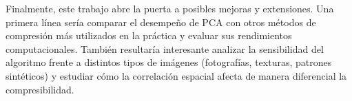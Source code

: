 \documentclass[12pt]{article}
\begin{document}
Finalmente, este trabajo abre la puerta a posibles mejoras y extensiones. Una primera línea sería comparar el desempeño de PCA con otros métodos de compresión más utilizados en la práctica y evaluar sus rendimientos computacionales. También resultaría interesante analizar la sensibilidad del algoritmo frente a distintos tipos de imágenes (fotografías, texturas, patrones sintéticos) y estudiar cómo la correlación espacial afecta de manera diferencial la compresibilidad.
\end{document}
